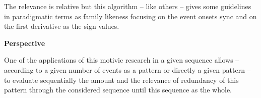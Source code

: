 \bigskip

The relevance is relative but this algorithm -- like others -- gives some guidelines in paradigmatic terms as family likeness focusing on the event onsets sync  and on the first derivative  as the sign values. 

\bigskip

\noindent \textbf{Perspective}
\smallskip

One of the applications of this motivic research in a given sequence allows -- according to a given number of events as a pattern or directly a given pattern -- to evaluate sequentially the amount and the relevance of redundancy of this pattern through the considered sequence until this sequence as the whole. 
